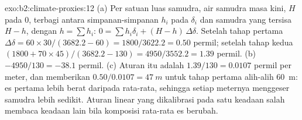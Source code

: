 \begin{solution}{exo:b2:climate-proxies:12}
(a) Per satuan luas samudra, air samudra masa kini, $H$ pada 0, terbagi antara simpanan-simpanan
$h_i$ pada $\delta_i$ dan samudra yang tersisa $H - h$, dengan $h = \sum h_i$: $0 = \sum h_i\delta_i +
(H - h)\,\Delta\delta$. Setelah tahap pertama $\Delta\delta = 60 \times 30/(3682.2 - 60) =
1800/3622.2 = 0.50$ permil; setelah tahap kedua $(1800 + 70 \times 45)/(3682.2 - 130) =
4950/3552.2 = 1.39$ permil. (b) $-4950/130 = -38.1$ permil. (c) Aturan itu adalah $1.39/130 = 0.0107$
permil per meter, dan memberikan $0.50/0.0107 = \qty{47}{m}$ untuk tahap pertama alih-alih
\qty{60}{m}: es pertama lebih berat daripada rata-rata, sehingga setiap meternya menggeser samudra
lebih sedikit. Aturan linear yang dikalibrasi pada satu keadaan salah membaca keadaan lain bila komposisi rata-rata
es berubah.
\end{solution}

